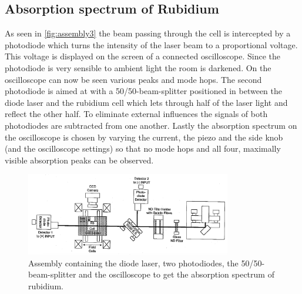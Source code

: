 \subsection{Absorption spectrum of Rubidium}
\label{sec:absorption}
As seen in \autoref{fig:assembly3} the beam passing through the cell is intercepted by a photodiode which turns the intensity of the laser beam to a proportional voltage.
This voltage is displayed on the screen of a connected oscilloscope.
Since the photodiode is very sensible to ambient light the room is darkened.
On the oscilloscope can now be seen various peaks and mode hops.
The second photodiode is aimed at with a 50/50-beam-splitter positioned in between the diode laser and the rubidium cell which lets through half of the laser light and reflect the other half.
To eliminate external influences the signals of both photodiodes are subtracted from one another.
Lastly the absorption spectrum on the oscilloscope is chosen by varying the current, the piezo and the side knob (and the oscilloscope settings) so that no mode hops and all four, maximally visible absorption peaks can be observed.
\begin{figure}
    \center
    \includegraphics[width=0.8\textwidth]{bilder/Assembly_3.png}
    \caption{Assembly containing the diode laser, two photodiodes, the 50/50-beam-splitter and the oscilloscope to get the absorption spectrum of rubidium. \cite{anleitung}}
    \label{fig:assembly3}
\end{figure}

\FloatBarrier
